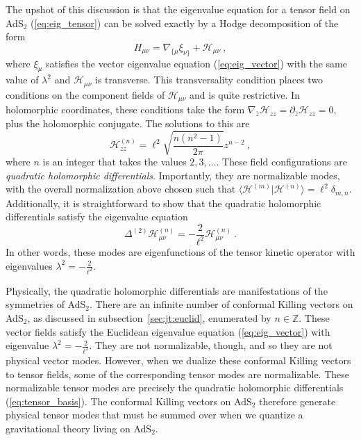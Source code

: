\documentclass[12pt]{article}
\newcommand{\bz}{\bar{z}}
\begin{document}
The upshot of this discussion is that the eigenvalue equation for a tensor field on AdS$_2$ (\ref{eq:eig_tensor}) can be solved exactly by a Hodge decomposition of the form
\begin{equation}
	H_{\mu\nu} = \nabla_{\{\mu} \xi_{\nu\}} + \mathcal{H}_{\mu\nu}~,
\end{equation}
where $\xi_\mu$ satisfies the vector eigenvalue equation (\ref{eq:eig_vector}) with the same value of $\lambda^2$ and $\mathcal{H}_{\mu\nu}$ is transverse.  This transversality condition places two conditions on the component fields of $\mathcal{H}_{\mu\nu}$ and is quite restrictive.  In holomorphic coordinates, these conditions take the form $\nabla_{\bz} \mathcal{H}_{zz} = \partial_{\bz} \mathcal{H}_{zz} = 0$, plus the holomorphic conjugate.  The solutions to this are
\begin{equation}
	\mathcal{H}_{zz}^{(n)} = \ell^2\sqrt{\frac{n(n^2-1)}{2\pi}} z^{n-2}~,
\label{eq:tensor_basis}
\end{equation}
where $n$ is an integer that takes the values $2,3,\ldots$.  These field configurations are \emph{quadratic holomorphic differentials}.  Importantly, they are normalizable modes, with the overall normalization above chosen such that $ \langle \mathcal{H}^{(m)} | \mathcal{H}^{(n)} \rangle = \ell^2 \delta_{m,n}$.  Additionally, it is straightforward to show that the quadratic holomorphic differentials satisfy the eigenvalue equation
\begin{equation}
	\Delta^{(2)} \mathcal{H}_{\mu\nu}^{(n)} = -\frac{2}{\ell^2} \mathcal{H}^{(n)}_{\mu\nu}~.	
\end{equation}
In other words, these modes are eigenfunctions of the tensor kinetic operator with eigenvalues $\lambda^2= - \frac{2}{\ell^2}$.

Physically, the quadratic holomorphic differentials are manifestations of the symmetries of AdS$_2$.  There are an infinite number of conformal Killing vectors on AdS$_2$, as discussed in subsection~\ref{sec:jt:euclid}, enumerated by $n \in \mathbb{Z}$.  These vector fields satisfy the Euclidean eigenvalue equation (\ref{eq:eig_vector}) with eigenvalue $\lambda^2 = - \frac{2}{\ell^2}$.  They are not normalizable, though, and so they are not physical vector modes.  However, when we dualize these conformal Killing vectors to tensor fields, some of the corresponding tensor modes are normalizable.  These normalizable tensor modes are precisely the quadratic holomorphic differentials (\ref{eq:tensor_basis}).  The conformal Killing vectors on AdS$_2$ therefore generate physical tensor modes that must be summed over when we quantize a gravitational theory living on AdS$_2$.
\end{document}
